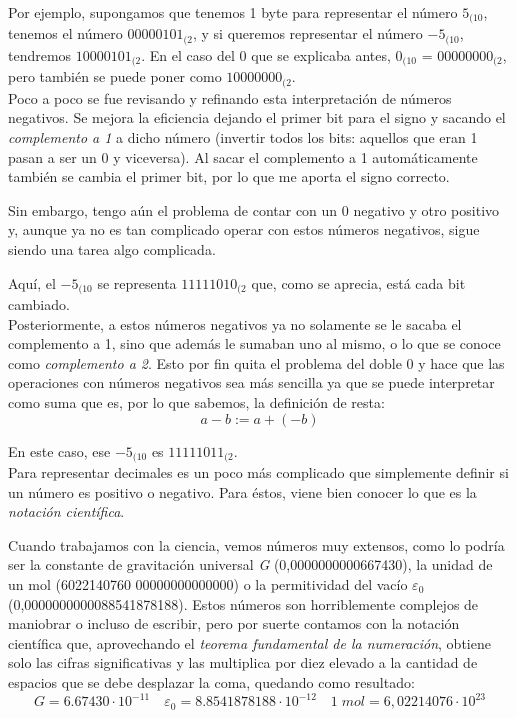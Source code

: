 \documentclass[12pt]{article}
\begin{document}
Por ejemplo, supongamos que tenemos 1 byte para representar el número \(5_{(10}\), tenemos el número \(00000101_{(2}\), y si queremos representar el número \(-5_{(10}\), tendremos \(10000101_{(2}\). En el caso del 0 que se explicaba antes, \(0_{(10}\) = \(00000000_{(2}\), pero también se puede poner como \(10000000_{(2}\).
\\

Poco a poco se fue revisando y refinando esta interpretación de números negativos. Se mejora la eficiencia dejando el primer bit para el signo y sacando el \emph{complemento a 1} a dicho número (invertir todos los bits: aquellos que eran 1 pasan a ser un 0 y viceversa). Al sacar el complemento a 1 automáticamente también se cambia el primer bit, por lo que me aporta el signo correcto.

Sin embargo, tengo aún el problema de contar con un 0 negativo y otro positivo y, aunque ya no es tan complicado operar con estos números negativos, sigue siendo una tarea algo complicada.

Aquí, el \(-5_{(10}\) se representa \(11111010_{(2}\) que, como se aprecia, está cada bit cambiado.
\\

Posteriormente, a estos números negativos ya no solamente se le sacaba el complemento a 1, sino que además le sumaban uno al mismo, o lo que se conoce como \emph{complemento a 2}. Esto por fin quita el problema del doble 0 y hace que las operaciones con números negativos sea más sencilla ya que se puede interpretar como suma que es, por lo que sabemos, la definición de resta:
\[
    a-b := a+(-b)
\]

En este caso, ese \(-5_{(10}\) es \(11111011_{(2}\).
\\

Para representar decimales es un poco más complicado que simplemente definir si un número es positivo o negativo. Para éstos, viene bien conocer lo que es la \emph{notación científica}.

Cuando trabajamos con la ciencia, vemos números muy extensos, como lo podría ser la constante de gravitación universal \emph{G} (0,0000000000667430), la unidad de un mol (6022140760 00000000000000) o la permitividad del vacío \(\varepsilon_0\) (0,0000000000088541878188). Estos números son horriblemente complejos de maniobrar o incluso de escribir, pero por suerte contamos con la notación científica que, aprovechando el \emph{teorema fundamental de la numeración}, obtiene solo las cifras significativas y las multiplica por diez elevado a la cantidad de espacios que se debe desplazar la coma, quedando como resultado:
\[
    G = 6.67430 \cdot 10^{-11} \quad \varepsilon_0 = 8.8541878188 \cdot 10^{-12} \quad 1 \; mol = 6,02214076 \cdot 10^{23} 
\]
\end{document}
